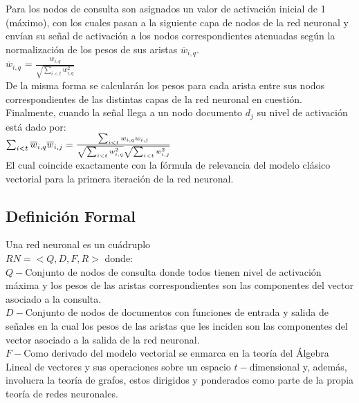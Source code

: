 \documentclass{llncs}
\begin{document}
Para los nodos de consulta son asignados un valor de activaci\'on inicial de 1 (m\'aximo), con los cuales pasan a la siguiente capa de nodos de la red neuronal y env\'ian
su se\~nal de activaci\'on a los nodos correspondientes atenuadas seg\'un la normalizaci\'on de los pesos de sus aristas $\overline{w}_{i,q}$.\\

$\overline{w}_{i, q}$ = $\frac{w_{i, q}}{\sqrt{\sum_{i < t}{w^2_{i, q}}}}$ \\

De la misma forma se calcular\'an los pesos para cada arista entre sus nodos correspondien\-tes de las distintas capas de la red neuronal en cuesti\'on. Finalmente,
cuando la se\~nal llega a un nodo documento $d_j$ su nivel de activaci\'on est\'a dado por: \\

$\sum_{i < t}{\overline{w}_{i, q}\overline{w}_{i, j}} = \frac{\sum_{i < t}{w_{i,q}w_{i,j}}}{\sqrt{\sum_{i < t}{w^2_{i, q}}} \* \sqrt{\sum_{i < t}{w^2_{i, j}}}}$ \\

El cual coincide exactamente con la f\'ormula de relevancia del modelo cl\'asico vectorial para la primera iteraci\'on de la red neuronal.\\

\subsection{Definici\'on Formal}

Una red neuronal es un cu\'adruplo \\$RN = <Q, D, F, R>$ donde: \\

$Q - $Conjunto de nodos de consulta donde todos tienen nivel de activaci\'on m\'axima y los pesos de las aristas correspondientes son las componentes del vector
asociado a la consulta.\\

$D - $Conjunto de nodos de documentos con funciones de entrada y salida de se\~nales en la cual los pesos de las aristas que les inciden son las componentes del
vector asociado a la salida de la red neuronal.\\

$F - $Como derivado del modelo vectorial se enmarca en la teor\'ia del \'Algebra Lineal de vectores y sus operaciones sobre un espacio $t-$dimensional y, adem\'as,
involucra la teor\'ia de grafos, estos dirigidos y ponderados como parte de la propia teor\'ia de redes neuronales.\\
\end{document}
